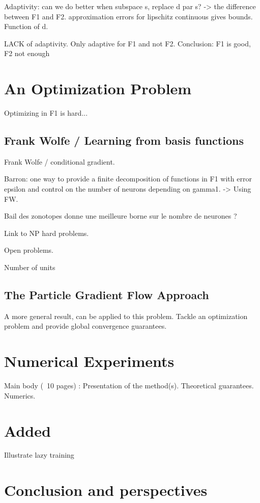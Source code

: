 \documentclass[a4paper, 11pt]{scrartcl}
\begin{document}
Adaptivity: can we do better when subspace s, replace d par s? -> the difference between F1 and F2.  approximation errors for lipschitz continuous gives bounds. Function of d. 

LACK of adaptivity. Only adaptive for F1 and not F2. Conclusion: F1 is good, F2 not enough

\section{An Optimization Problem}

Optimizing in F1 is hard...

\subsection{Frank Wolfe /  Learning from basis functions}

Frank Wolfe / conditional gradient.

Barron: one way to provide a finite decomposition of functions in F1 with error epsilon and control on the number of neurons depending on gamma1. -> Using FW.

Bail des zonotopes donne une meilleure borne sur le nombre de neurones ?

Link to NP hard problems.

Open problems.

Number of units

\subsection{The Particle Gradient Flow Approach}

A more general result, can be applied to this problem. Tackle an optimization problem and provide global convergence guarantees. \cite{chizat2018global}

\section{Numerical Experiments}

Main body (~10 pages) : 
Presentation of the method(s). 
Theoretical guarantees. 
Numerics. 


\section{Added}
Illustrate lazy training \cite{chizat:hal-01945578}

\section{Conclusion and perspectives}
\end{document}
